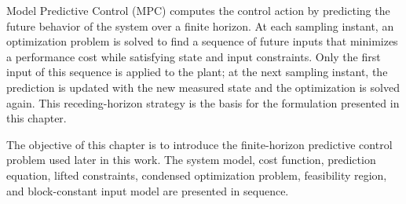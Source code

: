 \noindent
Model Predictive Control (MPC) computes the control action by predicting the future behavior of the system over a finite horizon. At each sampling instant, an optimization problem is solved to find a sequence of future inputs that minimizes a performance cost while satisfying state and input constraints. Only the first input of this sequence is applied to the plant; at the next sampling instant, the prediction is updated with the new measured state and the optimization is solved again. This receding-horizon strategy is the basis for the formulation presented in this chapter.

\noindent
The objective of this chapter is to introduce the finite-horizon predictive control problem used later in this work. The system model, cost function, prediction equation, lifted constraints, condensed optimization problem, feasibility region, and block-constant input model are presented in sequence.








